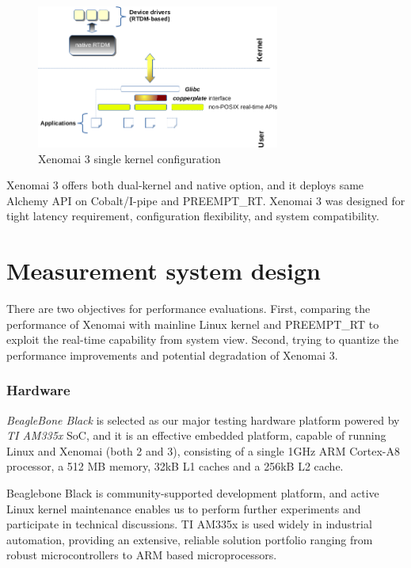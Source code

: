 \documentclass[10pt,a4paper]{article}
\begin{document}
\begin{multicols}{2}
\begin{figure}[H]
\begin{center}
\includegraphics[width=8cm]{img/x3-mercury.png}
\caption{Xenomai 3 single kernel configuration}
\label{xenomai3-coblat}
\end{center}
\end{figure}

Xenomai 3 offers both dual-kernel and native option, and it deploys same Alchemy \cite{x3-applications} API on Cobalt/I-pipe and PREEMPT\_RT. Xenomai 3 was designed for tight latency requirement, configuration flexibility, and system compatibility.

\section{Measurement system design}
There are two objectives for performance evaluations. First, comparing the performance of Xenomai with mainline Linux kernel and PREEMPT\_RT to exploit the real-time capability from system view. Second, trying to quantize the performance improvements and potential degradation of Xenomai 3.

\subsubsection{Hardware}
\textit{BeagleBone Black}\cite{bbb} is selected as our major testing hardware platform powered by \textit{TI AM335x} \cite{am335x} SoC, and it is an effective embedded platform, capable of running Linux and Xenomai (both 2 and 3), consisting of a single 1GHz ARM Cortex-A8 processor, a 512 MB memory, 32kB L1 caches and a 256kB L2 cache.

Beaglebone Black is community-supported development platform, and active Linux kernel maintenance enables us to perform further experiments and participate in technical discussions. TI AM335x is used widely in industrial automation, providing an extensive, reliable solution portfolio ranging from robust microcontrollers to ARM based microprocessors.


\end{multicols}
\end{document}
